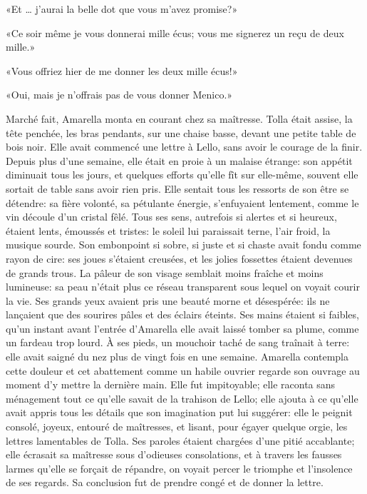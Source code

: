 «Et \ldots{} j'aurai la belle dot que vous m'avez promise?»

«Ce soir même je vous donnerai mille écus; vous me signerez un reçu de deux mille.»

«Vous offriez hier de me donner les deux mille écus!»

«Oui, mais je n'offrais pas de vous donner Menico.»

Marché fait, Amarella monta en courant chez sa maîtresse. Tolla était assise, la tête penchée, les bras pendants, sur une chaise basse, devant une petite table de bois noir. Elle avait commencé une lettre à Lello, sans avoir le courage de la finir. Depuis plus d'une semaine, elle était en proie à un malaise étrange: son appétit diminuait tous les jours, et quelques efforts qu'elle fît sur elle-même, souvent elle sortait de table sans avoir rien pris. Elle sentait tous les ressorts de son être se détendre: sa fière volonté, sa pétulante énergie, s'enfuyaient lentement, comme le vin découle d'un cristal fêlé. Tous ses sens, autrefois si alertes et si heureux, étaient lents, émoussés et tristes: le soleil lui paraissait terne, l'air froid, la musique sourde. Son embonpoint si sobre, si juste et si chaste avait fondu comme rayon de cire: ses joues s'étaient creusées, et les jolies fossettes étaient devenues de grands trous. La pâleur de son visage semblait moins fraîche et moins lumineuse: sa peau n'était plus ce réseau transparent sous lequel on voyait courir la vie. Ses grands yeux avaient pris une beauté morne et désespérée: ils ne lançaient que des sourires pâles et des éclairs éteints. Ses mains étaient si faibles, qu'un instant avant l'entrée d'Amarella elle avait laissé tomber sa plume, comme un fardeau trop lourd. À ses pieds, un mouchoir taché de sang traînait à terre: elle avait saigné du nez plus de vingt fois en une semaine. Amarella contempla cette douleur et cet abattement comme un habile ouvrier regarde son ouvrage au moment d'y mettre la dernière main. Elle fut impitoyable; elle raconta sans ménagement tout ce qu'elle savait de la trahison de Lello; elle ajouta à ce qu'elle avait appris tous les détails que son imagination put lui suggérer: elle le peignit consolé, joyeux, entouré de maîtresses, et lisant, pour égayer quelque orgie, les lettres lamentables de Tolla. Ses paroles étaient chargées d'une pitié accablante; elle écrasait sa maîtresse sous d'odieuses consolations, et à travers les fausses larmes qu'elle se forçait de répandre, on voyait percer le triomphe et l'insolence de ses regards. Sa conclusion fut de prendre congé et de donner la lettre.

